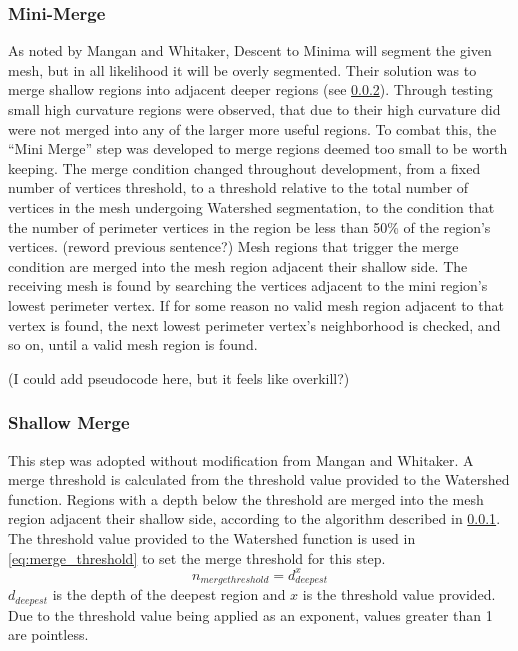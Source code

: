 \subsubsection{Mini-Merge}\label{sec:mini_merge}
As noted by Mangan and Whitaker, Descent to Minima will segment the given mesh, but in all likelihood it will be overly segmented.
Their solution was to merge shallow regions into adjacent deeper regions (see \ref{sec:shallow_merge}).
Through testing small high curvature regions were observed, that due to their high curvature did were not merged into any of the larger more useful regions.
To combat this, the ``Mini Merge'' step was developed to merge regions deemed too small to be worth keeping.
The merge condition changed throughout development, from a fixed number of vertices threshold, to a threshold relative to the total number of vertices in the mesh undergoing Watershed segmentation, to the condition that the number of perimeter vertices in the region be less than 50\% of the region's vertices.
(reword previous sentence?)
Mesh regions that trigger the merge condition are merged into the mesh region adjacent their shallow side.
The receiving mesh is found by searching the vertices adjacent to the mini region's lowest perimeter vertex.
If for some reason no valid mesh region adjacent to that vertex is found, the next lowest perimeter vertex's neighborhood is checked, and so on, until a valid mesh region is found.

(I could add pseudocode here, but it feels like overkill?)

\subsubsection{Shallow Merge}\label{sec:shallow_merge}
This step was adopted without modification from Mangan and Whitaker.
A merge threshold is calculated from the threshold value provided to the Watershed function.
Regions with a depth below the threshold are merged into the mesh region adjacent their shallow side, according to the algorithm described in \ref{sec:mini_merge}. %
The threshold value provided to the Watershed function is used in \ref{eq:merge_threshold} to set the merge threshold for this step.
\begin{equation}\label{eq:merge_threshold}
	n_{merge threshold} = d_{deepest}^{x}
\end{equation}
$d_{deepest}$ is the depth of the deepest region and $x$ is the threshold value provided.
Due to the threshold value being applied as an exponent, values greater than 1 are pointless.

